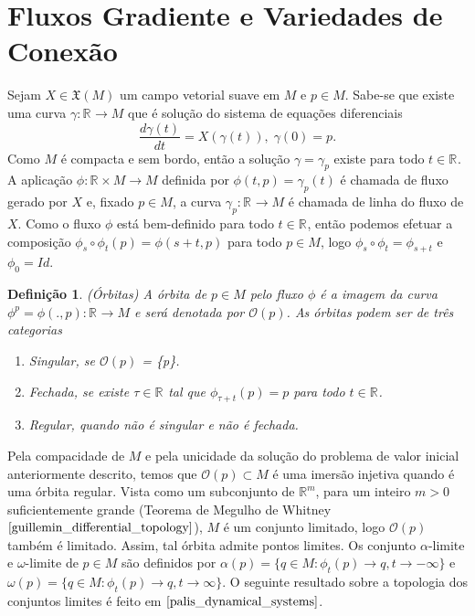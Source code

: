 \documentclass[12pt]{book}
\newtheorem{definicao}[teorema]{Definição}
\newcommand{\campossuaves}[1]{\mathfrak{X}(#1)}
\newcommand{\derivada}[2]{\frac{d #1}{d #2}}
\newcommand{\orbitaponto}[1]{\mathcal{O}(#1)}
\newcommand{\retacartesianovariedade}{\real{} \times M}
\newcommand{\real}[1]{\mathbb{R}^{#1}}
\newcommand{\reta}{\real{}}
\begin{document}
	\section{Fluxos Gradiente e Variedades de Conexão}\label{secao_fluxo_gradiente}
	Sejam $X \in \campossuaves{M}$ um campo vetorial suave em $M$ e $p \in M$. Sabe-se que existe uma curva $\gamma: \reta\to M$ que é solução do sistema de equações diferenciais 
	$$
	\derivada{\gamma(t)}{t} = X(\gamma(t)), \; \gamma(0) = p.
	$$
	Como $M$ é compacta e sem bordo, então a solução $\gamma = \gamma_{p}$ existe para todo $t\in \reta$. A aplicação $\phi: \retacartesianovariedade\to M$ definida por $\phi(t,p) = \gamma_{p}(t)$ é chamada de fluxo gerado por $X$ e, fixado $p\in M$, a curva $\gamma_{p}:\reta\to M$ é chamada de linha do fluxo de $X$. Como o fluxo $\phi$ está bem-definido para todo $t \in \reta$, então podemos efetuar a composição $\phi_{s}\circ\phi_{t}(p) = \phi(s+t, p)$ para todo $p\in M$, logo $\phi_{s}\circ\phi_{t} = \phi_{s+t}$ e $\phi_{0} = Id$.
	\begin{definicao}
		(Órbitas) A órbita de $p \in M$ pelo fluxo $\phi$ é a imagem da curva $\phi^{p} = \phi(.,p):\reta\to M$ e será denotada por $\orbitaponto{p}$. As órbitas podem ser de três categorias
		\begin{enumerate}
			\item Singular, se $\orbitaponto{p}$ = \{p\}.
			
			\item Fechada, se existe $\tau \in \reta$ tal que $\phi_{\tau+t}(p) = p$ para todo $t \in \reta$.
			
			\item Regular, quando não é singular e não é fechada.
		\end{enumerate}
		
	\end{definicao}
	
	Pela compacidade de $M$ e pela unicidade da solução do problema de valor inicial anteriormente descrito, temos que $\orbitaponto{p}\subset M$ é uma imersão injetiva quando é uma órbita regular. Vista como um subconjunto de $\real{m}$, para um inteiro $m>0$ suficientemente grande (Teorema de Megulho de Whitney $\cite{guillemin_differential_topology}$), $M$ é um conjunto limitado, logo $\orbitaponto{p}$ também é limitado. Assim, tal órbita admite pontos limites. Os conjunto $\alpha$-limite e $\omega$-limite de $p \in M$ são definidos por $\alpha(p) = \{q \in M: \phi_{t}(p) \to q, t \to -\infty\}$ e $\omega(p) = \{q \in M: \phi_{t}(p) \to q, t \to \infty\}$. O seguinte resultado sobre a topologia dos conjuntos limites é feito em $\cite{palis_dynamical_systems}$.
	
\end{document}
